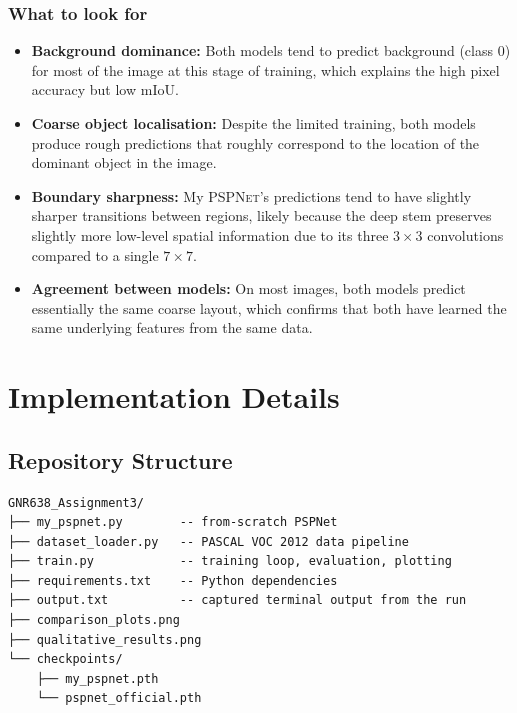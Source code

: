 \documentclass[12pt,a4paper]{article}
\newcommand{\pspnet}{\textsc{PSPNet}}
\newcommand{\mypsp}{My \pspnet{}}
\begin{document}
\subsubsection*{What to look for}

\begin{itemize}
    \item \textbf{Background dominance:} Both models tend to predict background
          (class 0) for most of the image at this stage of training, which
          explains the high pixel accuracy but low mIoU.
    \item \textbf{Coarse object localisation:} Despite the limited training,
          both models produce rough predictions that roughly correspond to the
          location of the dominant object in the image.
    \item \textbf{Boundary sharpness:} \mypsp{}'s predictions tend to have
          slightly sharper transitions between regions, likely because the deep
          stem preserves slightly more low-level spatial information due to its
          three $3\times3$ convolutions compared to a single $7\times7$.
    \item \textbf{Agreement between models:} On most images, both models
          predict essentially the same coarse layout, which confirms that both
          have learned the same underlying features from the same data.
\end{itemize}

\section{Implementation Details}

\subsection{Repository Structure}

\begin{verbatim}
GNR638_Assignment3/
├── my_pspnet.py        -- from-scratch PSPNet
├── dataset_loader.py   -- PASCAL VOC 2012 data pipeline
├── train.py            -- training loop, evaluation, plotting
├── requirements.txt    -- Python dependencies
├── output.txt          -- captured terminal output from the run
├── comparison_plots.png
├── qualitative_results.png
└── checkpoints/
    ├── my_pspnet.pth
    └── pspnet_official.pth
\end{verbatim}
\end{document}
